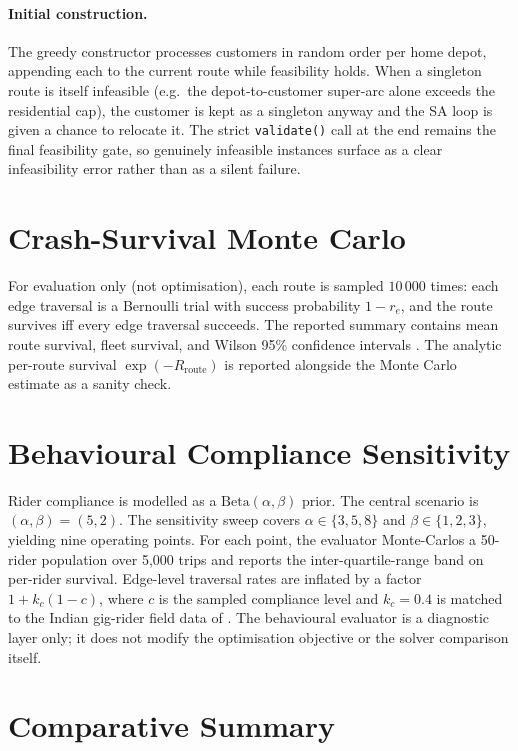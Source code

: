\paragraph{Initial construction.}
The greedy constructor processes customers in random order per home
depot, appending each to the current route while feasibility holds.
When a singleton route is itself infeasible (e.g.\ the depot-to-customer
super-arc alone exceeds the residential cap), the customer is kept as
a singleton anyway and the SA loop is given a chance to relocate it.
The strict \texttt{validate()} call at the end remains the final
feasibility gate, so genuinely infeasible instances surface as a
clear infeasibility error rather than as a silent failure.

\section{Crash-Survival Monte Carlo}

For evaluation only (not optimisation), each route is sampled
$10\,000$ times: each edge traversal is a Bernoulli trial with
success probability $1 - r_e$, and the route survives iff every edge
traversal succeeds. The reported summary contains mean route survival,
fleet survival, and Wilson 95\% confidence intervals
\citep{wilson1927}. The analytic per-route survival
$\exp(-R_{\text{route}})$ is reported alongside the Monte Carlo
estimate as a sanity check.

\section{Behavioural Compliance Sensitivity}
\label{ch5:behav}

Rider compliance is modelled as a $\mathrm{Beta}(\alpha, \beta)$
prior. The central scenario is $(\alpha, \beta) = (5, 2)$. The
sensitivity sweep covers $\alpha \in \{3, 5, 8\}$ and
$\beta \in \{1, 2, 3\}$, yielding nine operating points. For each
point, the evaluator Monte-Carlos a 50-rider population over 5{,}000
trips and reports the inter-quartile-range band on per-rider
survival. Edge-level traversal rates are inflated by a factor
$1 + k_c (1 - c)$, where $c$ is the sampled compliance level and
$k_c = 0.4$ is matched to the Indian gig-rider field data of
\citet{das2020}. The behavioural evaluator is a diagnostic layer
only; it does not modify the optimisation objective or the solver
comparison itself.

\section{Comparative Summary}

